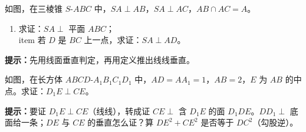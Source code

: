 \documentclass{exam-zh}
\begin{document}

\begin{problem}[points=9]
  \noindent
  \begin{minipage}[t]{\dimexpr\linewidth-60mm-6mm\relax}
    \vspace{0pt}
    如图，在三棱锥 $S\text{-}ABC$ 中，$SA\perp AB$，$SA\perp AC$，$AB\cap AC=A$。
\ \begin{enumerate}[label=(\arabic*)]
  \item 求证：$SA\perp$ 平面 $ABC$；
  \\ item 若 $D$ 是 $BC$ 上一点，求证：$SA\perp AD$。
\end{enumerate}

    \begin{hintbox}
\textbf{提示：}先用线面垂直判定，再用定义推出线线垂直。\end{hintbox}

  \end{minipage}\hfill
  \begin{diagramcoltikz}{60mm}{三棱锥 S-ABC，∠ABC=90°，D 为 AC 中点，观察 SD 与面 ABC 内两条相交线。}
  }
  \end{diagramcoltikz}
  \par\medskip
  \answerarea[56mm]
\end{problem}



\begin{problem}[points=9]
  \noindent
  \begin{minipage}[t]{\dimexpr\linewidth-60mm-6mm\relax}
    \vspace{0pt}
    如图，在长方体 $ABCD\text{-}A_1B_1C_1D_1$ 中，$AD=AA_1=1$，$AB=2$，$E$ 为 $AB$ 的中点。求证：$D_1E\perp CE$。

    \begin{hintbox}
\textbf{提示：}要证 $D_1E\perp CE$（线线），转成证 $CE\perp$ 含 $D_1E$ 的面 $D_1DE$。$DD_1\perp$ 底面给一条；$DE$ 与 $CE$ 的垂直怎么证？算 $DE^2+CE^2$ 是否等于 $DC^2$（勾股逆）。\end{hintbox}

  \end{minipage}\hfill
  \begin{diagramcoltikz}{60mm}{长方体，E 为 AB 中点，观察 CE 与 D1E 是否垂直。}
  }
  \end{diagramcoltikz}
  \par\medskip
  \answerarea[48mm]
\end{problem}
\end{document}

